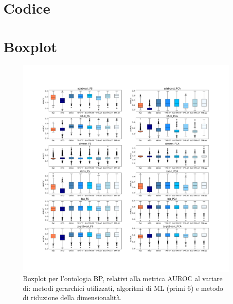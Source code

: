 \documentclass[12pt]{report}
\begin{document}
%
\begin{appendices}
\chapter{Codice}


\newpage

\chapter{Boxplot}
\begin{figure}[h]
 \hspace*{-2.6cm}
\includegraphics[scale=0.34]{./images/BP_AUC_1.png}
\caption{\footnotesize{Boxplot per l'ontologia BP, relativi alla metrica AUROC al variare di: metodi gerarchici utilizzati, algoritmi di ML (primi 6) e metodo di riduzione della dimensionalità.}}
\label{BP_AUC_1}
\end{figure}



\end{appendices}
\end{document}
